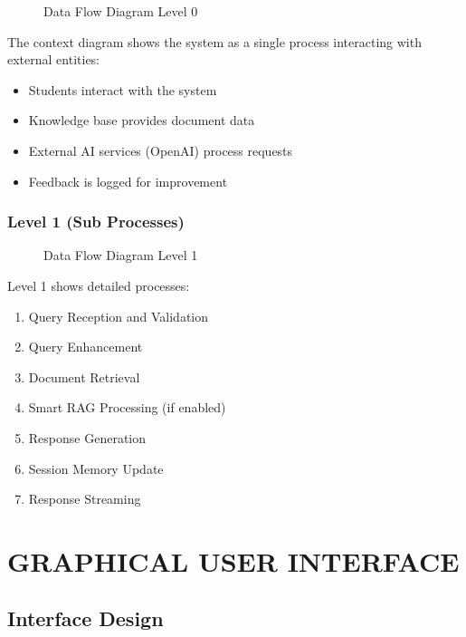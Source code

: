 \documentclass[12pt,a4paper]{book}
\numberwithin{table}{chapter}
\numberwithin{figure}{chapter}
\numberwithin{equation}{chapter}
\begin{document}
\begin{figure}[h]
\caption{Data Flow Diagram Level 0}
\label{fig:dfd0}
\end{figure}

The context diagram shows the system as a single process interacting with external entities:
\begin{itemize}
    \item Students interact with the system
    \item Knowledge base provides document data
    \item External AI services (OpenAI) process requests
    \item Feedback is logged for improvement
\end{itemize}

\subsection{Level 1 (Sub Processes)}

\begin{figure}[h]
\caption{Data Flow Diagram Level 1}
\label{fig:dfd1}
\end{figure}

Level 1 shows detailed processes:
\begin{enumerate}
    \item Query Reception and Validation
    \item Query Enhancement
    \item Document Retrieval
    \item Smart RAG Processing (if enabled)
    \item Response Generation
    \item Session Memory Update
    \item Response Streaming
\end{enumerate}

\clearpage

\chapter{GRAPHICAL USER INTERFACE}

\section{Interface Design}
\end{document}
